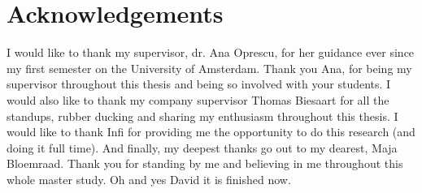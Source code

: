 \documentclass[../main]{subfiles}
\begin{document}
\chapter*{Acknowledgements}
I would like to thank my supervisor, dr. Ana Oprescu, for her guidance ever since my first semester on the University of Amsterdam.
Thank you Ana, for being my supervisor throughout this thesis and being so involved with your students.
I would also like to thank my company supervisor Thomas Biesaart for all the standups, rubber ducking and sharing my enthusiasm throughout this thesis.
I would like to thank Infi for providing me the opportunity to do this research (and doing it full time).
And finally, my deepest thanks go out to my dearest, Maja Bloemraad.
Thank you for standing by me and believing in me throughout this whole master study.
\newline
\newline
Oh and yes David it is finished now.
\end{document}

